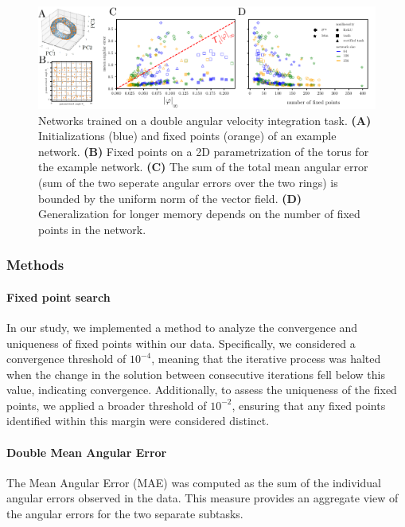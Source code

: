 \documentclass{article} %
\newcounter{ct}
\theoremstyle{definition}
\theoremstyle{remark}
\begin{document}
\begin{figure}[tbhp]
  \centering
  \includegraphics[width=\textwidth]{davit_ss}
  \caption{%
      Networks trained on a double angular velocity integration task.
    \textbf{(A)} Initializations (blue) and fixed points (orange) of an example network.
    \textbf{(B)} Fixed points on a 2D parametrization of the torus for the example network.
    \textbf{(C)} The sum of the total mean angular error (sum of the two seperate angular errors over the two rings) is bounded by the uniform norm of the vector field.
    \textbf{(D)} Generalization for longer memory depends on the number of fixed points in the network.
}\label{fig:davit}
\end{figure}




\subsubsection{Methods}\label{sec:supp:fastslowmethod}
\paragraph{Fixed point search}
In our study, we implemented a  method to analyze the convergence and uniqueness of fixed points within our data.
 Specifically, we considered a convergence threshold of \(10^{-4}\), meaning that the iterative process was halted when the change in the solution between consecutive iterations fell below this value, indicating convergence. Additionally, to assess the uniqueness of the fixed points, we applied a broader threshold of  \(10^{-2}\), ensuring that any fixed points identified within this margin were considered distinct.


\paragraph{Double Mean Angular Error}
The Mean Angular Error (MAE) was computed as the sum of the individual angular errors observed in the data.
 This measure provides an aggregate view of the angular errors for the two separate subtasks.
\end{document}
